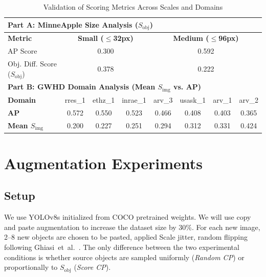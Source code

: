 \documentclass[conference]{IEEEtran}
\begin{document}
\begin{table}[ht]
\centering
\caption{Validation of Scoring Metrics Across Scales and Domains}
\label{tab:scoring_validation}
\footnotesize %
\setlength{\tabcolsep}{0pt} %
\begin{tabular*}{\columnwidth}{@{\extracolsep{\fill}}lccccccc@{}}
\toprule
\multicolumn{8}{l}{\textbf{Part A: MinneApple Size Analysis ($S_{\mathrm{obj}}$)}} \\ \midrule
\textbf{Metric} & \multicolumn{3}{c}{\textbf{Small ($\le$32px)}} & \multicolumn{4}{c}{\textbf{Medium ($\le$96px)}} \\
AP Score & \multicolumn{3}{c}{0.300} & \multicolumn{4}{c}{0.592} \\
Obj. Diff. Score ($S_{\text{obj}}$) & \multicolumn{3}{c}{0.378} & \multicolumn{4}{c}{0.222} \\ 
\midrule \midrule
\multicolumn{8}{l}{\textbf{Part B: GWHD Domain Analysis (Mean $S_{\text{img}}$ vs. AP)}} \\ \midrule
\textbf{Domain} & rres\_1 & ethz\_1 & inrae\_1 & arv\_3 & usask\_1 & arv\_1 & arv\_2 \\
\textbf{AP} & 0.572 & 0.550 & 0.523 & 0.466 & 0.408 & 0.403 & 0.365 \\
\textbf{Mean $S_{\text{img}}$} & 0.200 & 0.227 & 0.251 & 0.294 & 0.312 & 0.331 & 0.424 \\ \bottomrule
\end{tabular*}
\vspace{-10pt} %
\end{table}

\section{Augmentation Experiments}

\subsection{Setup}

We use YOLOv8s initialized from COCO pretrained weights.
We will use copy and paste augmentation to increase the dataset size by 30\%.
For each new image, 2--8 new objects are chosen to be pasted, applied
Scale jitter, random flipping following
Ghiasi~et~al.~\cite{ghiasi2021simple}.
The only difference between the two experimental conditions is
whether source objects are sampled uniformly (\textit{Random CP})
or proportionally to $S_{\mathrm{obj}}$ (\textit{Score CP}).
\end{document}
